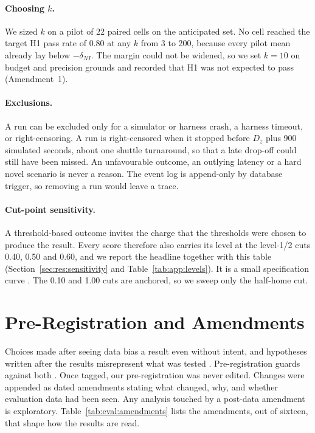\paragraph{Choosing $k$.} We sized $k$ on a pilot of 22 paired cells on the
anticipated set. No cell reached the target H1 pass rate of 0.80 at any $k$
from 3 to 200, because every pilot mean already lay below $-\delta_{NI}$. The
margin could not be widened, so we set $k = 10$ on budget and precision grounds
and recorded that H1 was not expected to pass (Amendment~1).

\paragraph{Exclusions.} A run can be excluded only for a simulator or harness
crash, a harness timeout, or right-censoring. A run is right-censored when it
stopped before $D_z$ plus 900 simulated seconds, about one shuttle turnaround,
so that a late drop-off could still have been missed. An unfavourable outcome,
an outlying latency or a hard novel scenario is never a reason. The event log
is append-only by database trigger, so removing a run would leave a trace.

\paragraph{Cut-point sensitivity.}
\label{sec:eval:sensitivity}
A threshold-based outcome invites the charge that the thresholds were chosen to
produce the result. Every score therefore also carries its level at the
level-1/2 cuts 0.40, 0.50 and 0.60, and we report the headline together with
this table (Section~\ref{sec:res:sensitivity} and
Table~\ref{tab:app:levels}). It is a small specification curve
\parencite{simonsohn2020}. The 0.10 and 1.00 cuts are
anchored, so we sweep only the half-home cut.

\section{Pre-Registration and Amendments}
\label{sec:eval:prereg}

Choices made after seeing data bias a result even without intent, and
hypotheses written after the results misrepresent what was tested
\parencite{gelman2014}. Pre-registration guards against both
\parencite{nosek2018}. Once
tagged, our pre-registration was never edited. Changes were appended as dated
amendments stating what changed, why, and whether evaluation data had been
seen. Any analysis touched by a post-data amendment is exploratory.
Table~\ref{tab:eval:amendments} lists the amendments, out of sixteen, that
shape how the results are read.

